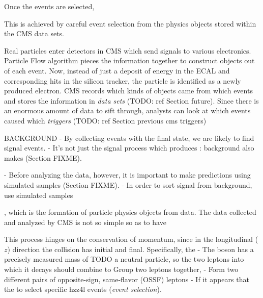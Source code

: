 Once the events are selected,

This is achieved by careful event selection from the physics objects stored within the CMS data sets.



Real particles enter detectors in CMS which send signals to various electronics.
Particle Flow algorithm pieces the information together to construct objects out of each event.
Now, instead of just a deposit of energy in the ECAL and corresponding hits in the silicon tracker, the particle is identified as a newly produced electron.
CMS records which kinds of objects came from which events and stores the information in \emph{data sets} (TODO: ref Section future).
Since there is an enormous amount of data to sift through, analysts can look at which events caused which \emph{triggers} (TODO: ref Section previous cms triggers)



BACKGROUND
- By collecting events with the \fourl final state, we are likely to find signal events.
    - It's not just the signal process which produces \fourl: background also makes \fourl (Section FIXME).

- Before analyzing the data, however, it is important to make predictions using simulated samples (Section FIXME).
- In order to sort signal from background, use simulated samples 



, which is the formation of particle physics objects from data.
The data collected and analyzed by CMS is not so simple so as to have \htozz


This process hinges on the conservation of momentum, since in the longitudinal ($z$) direction the \pp collision has initial and final.
Specifically, the 
    - The \PZ boson has a precisely measured mass of TODO a neutral particle, so the two leptons into which it decays should combine to Group two leptons together, 
    - Form two different pairs of opposite-sign, same-flavor (OSSF) leptons
    - If it appears that the to select specific hzz4l events (\emph{event selection}).